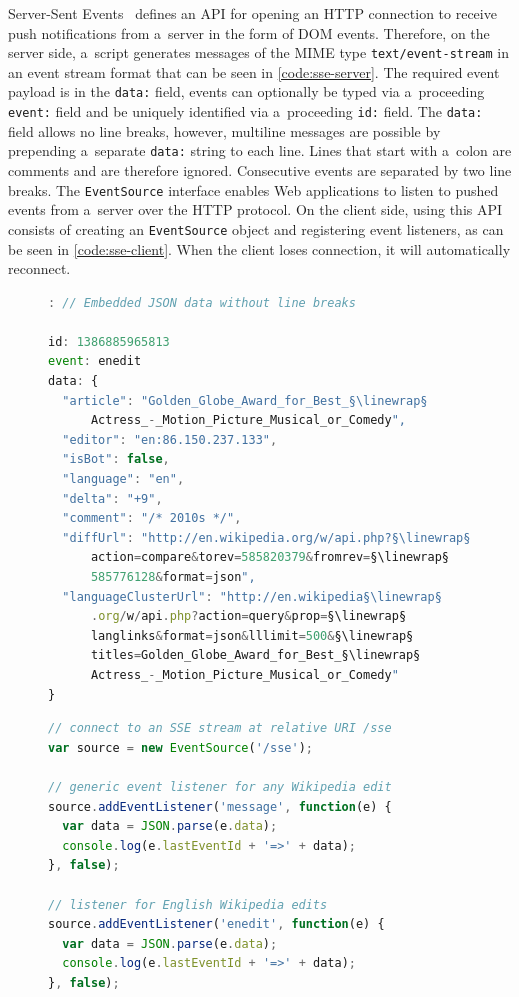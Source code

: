 \documentclass{sig-alternate}
\newcommand{\linewrap}{\raisebox{-.6ex}{\textcolor{grey}{$\hookleftarrow$}}}
\begin{document}
Server-Sent Events~\cite{hickson2012sse}
defines an API for opening an HTTP connection
to receive push notifications from a~server
in the form of DOM events.
Therefore, on the server side, a~script generates messages
of the MIME type \texttt{text/event-stream}
in an event stream format that can be seen
in \autoref{code:sse-server}.
The required event payload is in the \texttt{data:} field,
events can optionally be typed via a~proceeding \texttt{event:} field
and be uniquely identified via a~proceeding \texttt{id:} field.
The \texttt{data:} field allows no line breaks,
however, multiline messages are possible by prepending
a~separate \texttt{data:} string to each line.
Lines that start with a~colon are comments and are therefore ignored.
Consecutive events are separated by two line breaks.
The \texttt{EventSource} interface enables Web applications
to listen to pushed events from a~server over the HTTP protocol.
On the client side, using this API consists of creating
an \texttt{EventSource} object and registering event listeners,
as can be seen in \autoref{code:sse-client}.
When the client loses connection,
it will automatically reconnect.

\begin{figure}[h!]
\begin{lstlisting}[caption={Server-Sent Event of type ``enedit''
  (formatted for legibility, \texttt{data:} allows no line breaks)},
  label=code:sse-server, language=JavaScript]
: // Embedded JSON data without line breaks

id: 1386885965813
event: enedit
data: {
  "article": "Golden_Globe_Award_for_Best_§\linewrap§
      Actress_-_Motion_Picture_Musical_or_Comedy",
  "editor": "en:86.150.237.133",
  "isBot": false,
  "language": "en",
  "delta": "+9",
  "comment": "/* 2010s */",
  "diffUrl": "http://en.wikipedia.org/w/api.php?§\linewrap§
      action=compare&torev=585820379&fromrev=§\linewrap§
      585776128&format=json",
  "languageClusterUrl": "http://en.wikipedia§\linewrap§
      .org/w/api.php?action=query&prop=§\linewrap§
      langlinks&format=json&lllimit=500&§\linewrap§
      titles=Golden_Globe_Award_for_Best_§\linewrap§
      Actress_-_Motion_Picture_Musical_or_Comedy"
}
\end{lstlisting}

\begin{lstlisting}[caption={Creation of an \texttt{EventSource}
  object and registration of two event listeners},
  label=code:sse-client, language=JavaScript]
// connect to an SSE stream at relative URI /sse
var source = new EventSource('/sse');

// generic event listener for any Wikipedia edit
source.addEventListener('message', function(e) {
  var data = JSON.parse(e.data);
  console.log(e.lastEventId + '=>' + data);
}, false);

// listener for English Wikipedia edits
source.addEventListener('enedit', function(e) {
  var data = JSON.parse(e.data);
  console.log(e.lastEventId + '=>' + data);
}, false);
\end{lstlisting}
\end{figure}
\end{document}
